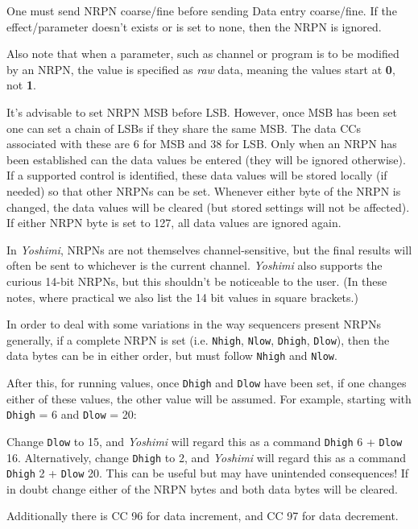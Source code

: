    One must send NRPN coarse/fine before sending Data entry coarse/fine.  If
   the effect/parameter doesn't exists or is set to none, then the NRPN is
   ignored.

   Also note that when a parameter, such as channel or program is to be modified
   by an NRPN, the value is specified as \textsl{raw} data, meaning the values
   start at \textbf{0}, not \textbf{1}.

   It's advisable to set NRPN MSB before LSB. However, once MSB has
   been set one can set a chain of LSBs if they share the same MSB.
   The data CCs associated with these are 6 for MSB and 38 for LSB.
   Only when an NRPN has been established can the data values be entered
   (they will be ignored otherwise).
   If a supported control is identified, these data values will be stored
   locally (if needed) so that other NRPNs can be set.
   Whenever either byte of the NRPN is changed, the data values will be
   cleared (but stored settings will not be affected).
   If either NRPN byte is set to 127, all data values are ignored again.

   In \textsl{Yoshimi}, NRPNs are not themselves channel-sensitive, but the
   final results will often be sent to whichever is the current channel.
   \textsl{Yoshimi} also supports the curious 14-bit NRPNs, but this shouldn't
   be noticeable to the user.
   (In these notes, where practical we also list the 14 bit values in square
   brackets.)

   In order to deal with some
   variations in the way sequencers present NRPNs generally, if a complete
   NRPN is set
   (i.e. \texttt{Nhigh}, \texttt{Nlow}, \texttt{Dhigh}, \texttt{Dlow}),
   then the data bytes can be in
   either order, but must follow \texttt{Nhigh} and \texttt{Nlow}.

   After this, for running values, once
   \texttt{Dhigh} and \texttt{Dlow} have been set, if one
   changes either of these values, the other value will be assumed.
   For example, starting with \texttt{Dhigh} = 6 and \texttt{Dlow} = 20:

   Change \texttt{Dlow} to 15, and \textsl{Yoshimi} will regard this as a
   command \texttt{Dhigh} 6 + \texttt{Dlow} 16.
   Alternatively, change
   \texttt{Dhigh} to 2, and \textsl{Yoshimi} will regard this as a
   command \texttt{Dhigh} 2 + \texttt{Dlow} 20.
   This can be useful but may have unintended consequences!
   If in doubt change either of the NRPN bytes and both data bytes will be
   cleared.

   Additionally there is CC 96 for data increment, and CC 97 for data
   decrement.

